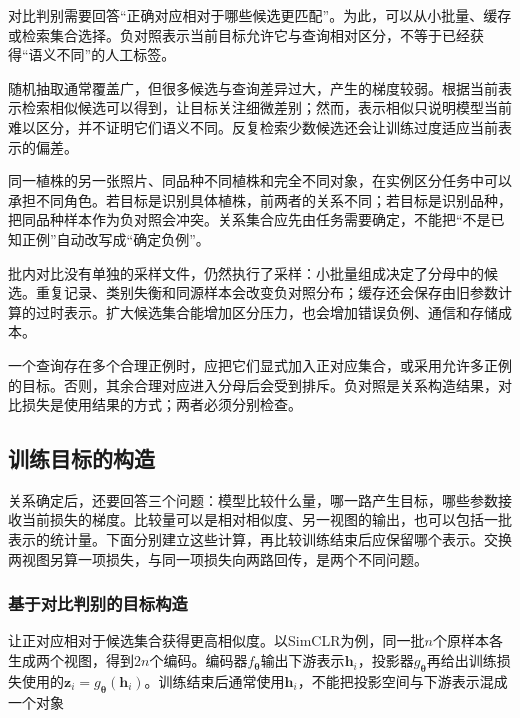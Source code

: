 对比判别需要回答“正确对应相对于哪些候选更匹配”。为此，可以从小批量、缓存或检索集合选择。负对照表示当前目标允许它与查询相对区分，不等于已经获得“语义不同”的人工标签。

随机抽取通常覆盖广，但很多候选与查询差异过大，产生的梯度较弱。根据当前表示检索相似候选可以得到，让目标关注细微差别；然而，表示相似只说明模型当前难以区分，并不证明它们语义不同。反复检索少数候选还会让训练过度适应当前表示的偏差。

同一植株的另一张照片、同品种不同植株和完全不同对象，在实例区分任务中可以承担不同角色。若目标是识别具体植株，前两者的关系不同；若目标是识别品种，把同品种样本作为负对照会冲突。关系集合应先由任务需要确定，不能把“不是已知正例”自动改写成“确定负例”。

批内对比没有单独的采样文件，仍然执行了采样：小批量组成决定了分母中的候选。重复记录、类别失衡和同源样本会改变负对照分布；缓存还会保存由旧参数计算的过时表示。扩大候选集合能增加区分压力，也会增加错误负例、通信和存储成本。

一个查询存在多个合理正例时，应把它们显式加入正对应集合，或采用允许多正例的目标。否则，其余合理对应进入分母后会受到排斥。负对照是关系构造结果，对比损失是使用结果的方式；两者必须分别检查。

\subsection{训练目标的构造}
\label{sec:data-derived-knowledge-training-objectives}

关系确定后，还要回答三个问题：模型比较什么量，哪一路产生目标，哪些参数接收当前损失的梯度。比较量可以是相对相似度、另一视图的输出，也可以包括一批表示的统计量。下面分别建立这些计算，再比较训练结束后应保留哪个表示。交换两视图另算一项损失，与同一项损失向两路回传，是两个不同问题。

\Needspace{80mm}
\subsubsection{基于对比判别的目标构造}
\label{sec:data-derived-knowledge-contrastive}

让正对应相对于候选集合获得更高相似度。以SimCLR为例，同一批$n$个原样本各生成两个视图，得到$2n$个编码。编码器$f_{\bm{\theta}}$输出下游表示$\bm{h}_i$，投影器$g_{\bm{\theta}}$再给出训练损失使用的$\bm{z}_i=g_{\bm{\theta}}(\bm{h}_i)$。训练结束后通常使用$\bm{h}_i$，不能把投影空间与下游表示混成一个对象

